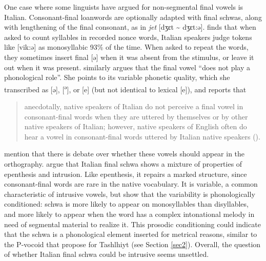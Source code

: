 \documentclass[output=paper,colorlinks,citecolor=brown]{langscibook}
\begin{document}
One case where some linguists have argued for non-segmental final vowels is Italian. Consonant\hyp final loanwords are optionally adapted with final schwas, along with lengthening of the final consonant, as in \textit{jet} [dʒɛt {\textasciitilde} dʒɛt:ə]. \citet{Miatto2020} finds that when asked to count syllables in recorded nonce words, Italian speakers judge tokens like [vik:ə] as monosyllabic 93\% of the time. When asked to repeat the words, they sometimes insert final [ə] when it was absent from the stimulus, or leave it out when it was present. \citet{Repetti2012} similarly argues that the final vowel “does not play a phonological role”. She points to its variable phonetic quality, which she transcribed as [ə], [\textsuperscript{ə}], or [e] (but not identical to lexical [e]), and reports that 

\begin{quote}
anecdotally, native speakers of Italian do not perceive a final vowel in consonant\hyp final words when they are uttered by themselves or by other native speakers of Italian; however, native speakers of English often do hear a vowel in consonant\hyp final words uttered by Italian native speakers (\cite[175]{Repetti2012}). 
\end{quote}

\citet{Griceetal2018} mention that there is debate over whether these vowels should appear in the orthography. \citet{Griceetal2018} argue that Italian final schwa shows a mixture of properties of epenthesis and intrusion. Like epenthesis, it repairs a marked structure, since consonant\hyp final words are rare in the native vocabulary. It is variable, a common characteristic of intrusive vowels, but \citeauthor{Griceetal2018}  show that the variability is phonologically conditioned: schwa is more likely to appear on monosyllables than disyllables, and more likely to appear when the word has a complex intonational melody in need of segmental material to realize it. This prosodic conditioning could indicate that the schwa is a phonological element inserted for metrical reasons, similar to the P-vocoid that \citet{ridouane2019story} propose for Tashlhiyt (see Section \ref{sec2}).
Overall, the question of whether Italian final schwa could be intrusive seems unsettled. 
\end{document}

